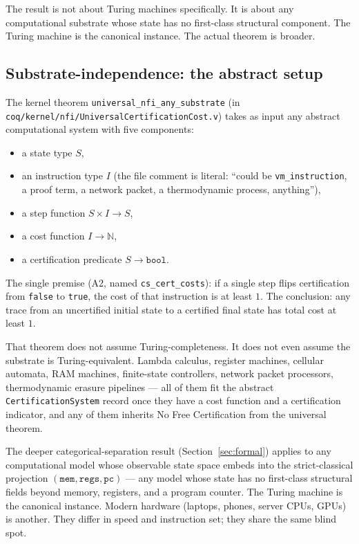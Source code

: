\documentclass[11pt,a4paper]{article}
\theoremstyle{plain}
\theoremstyle{definition}
\theoremstyle{remark}
\begin{document}
The result is not about Turing machines specifically. It is about any computational substrate whose state has no first-class structural component. The Turing machine is the canonical instance. The actual theorem is broader.

\subsection{Substrate-independence: the abstract setup}

The kernel theorem \texttt{universal\_nfi\_any\_substrate} (in \texttt{coq/kernel/nfi/UniversalCertificationCost.v}) takes as input any abstract computational system with five components:

\begin{itemize}
\item a state type $S$,
\item an instruction type $I$ (the file comment is literal: ``could be \texttt{vm\_instruction}, a proof term, a network packet, a thermodynamic process, anything''),
\item a step function $S \times I \to S$,
\item a cost function $I \to \mathbb{N}$,
\item a certification predicate $S \to \texttt{bool}$.
\end{itemize}

The single premise (A2, named \texttt{cs\_cert\_costs}): if a single step flips certification from \texttt{false} to \texttt{true}, the cost of that instruction is at least $1$. The conclusion: any trace from an uncertified initial state to a certified final state has total cost at least $1$.

That theorem does not assume Turing-completeness. It does not even assume the substrate is Turing-equivalent. Lambda calculus, register machines, cellular automata, RAM machines, finite-state controllers, network packet processors, thermodynamic erasure pipelines --- all of them fit the abstract \texttt{CertificationSystem} record once they have a cost function and a certification indicator, and any of them inherits No Free Certification from the universal theorem.

The deeper categorical-separation result (Section~\ref{sec:formal}) applies to any computational model whose observable state space embeds into the strict-classical projection $(\texttt{mem}, \texttt{regs}, \texttt{pc})$ --- any model whose state has no first-class structural fields beyond memory, registers, and a program counter. The Turing machine is the canonical instance. Modern hardware (laptops, phones, server CPUs, GPUs) is another. They differ in speed and instruction set; they share the same blind spot.
\end{document}
